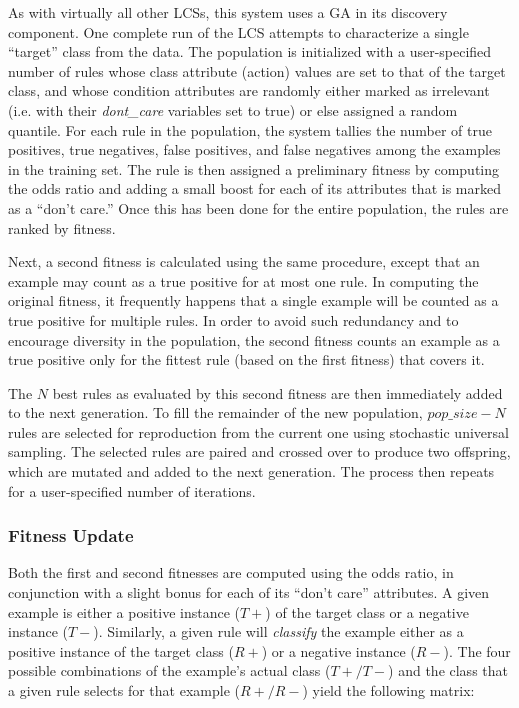 \documentclass[11pt]{article}
\begin{document}
As with virtually all other LCSs, this system uses a GA in its discovery component. One complete run of the LCS attempts to characterize a single ``target'' class from the data. The population is initialized with a user-specified number of rules whose class attribute (action) values are set to that of the target class, and whose condition attributes are randomly either marked as irrelevant (i.e. with their \textit{dont\_care} variables set to true) or else assigned a random quantile. For each rule in the population, the system tallies the number of true positives, true negatives, false positives, and false negatives among the examples in the training set. The rule is then assigned a preliminary fitness by computing the odds ratio and adding a small boost for each of its attributes that is marked as a ``don't care.'' Once this has been done for the entire population, the rules are ranked by fitness. 

Next, a second fitness is calculated using the same procedure, except that an example may count as a true positive for at most one rule. In computing the original fitness, it frequently happens that a single example will be counted as a true positive for multiple rules. In order to avoid such redundancy and to encourage diversity in the population, the second fitness counts an example as a true positive only for the fittest rule (based on the first fitness) that covers it. 

The $N$ best rules as evaluated by this second fitness are then immediately added to the next generation. To fill the remainder of the new population, $pop\_size - N$ rules are selected for reproduction from the current one using stochastic universal sampling. The selected rules are paired and crossed over to produce two offspring, which are mutated and added to the next generation. The process then repeats for a user-specified number of iterations.

\subsubsection{Fitness Update}

Both the first and second fitnesses are computed using the odds ratio, in conjunction with a slight bonus for each of its ``don't care'' attributes. A given example is either a positive instance ($T+$) of the target class or a negative instance ($T-$). Similarly, a given rule will \emph{classify} the example either as a positive instance of the target class ($R+$) or a negative instance ($R-$). The four possible combinations of the example's actual class \mbox{($T+/T-$)} and the class that a given rule selects for that example ($R+/R-$) yield the following matrix:
\end{document}
